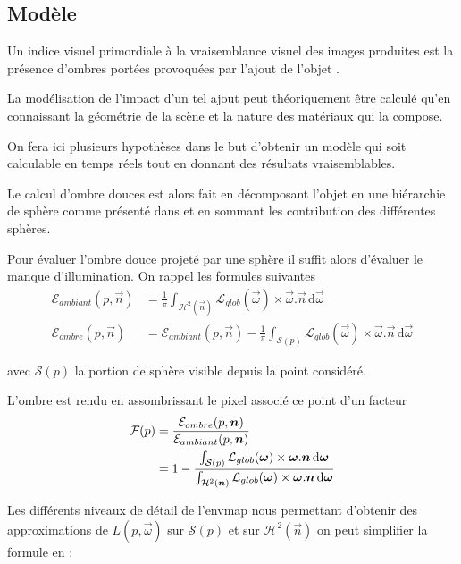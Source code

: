 \documentclass[10pt,a4paper,twoside, twocolumn]{report}
\begin{document}
\subsection{Modèle}

Un indice visuel primordiale à la vraisemblance visuel des images produites est la présence d'ombres portées provoquées par l'ajout de l'objet .

La modélisation de l'impact d'un tel ajout peut théoriquement être calculé qu'en connaissant la géométrie de la scène et la nature des matériaux qui la compose.

On fera ici plusieurs hypothèses dans le but d'obtenir un modèle qui soit calculable en temps réels tout en donnant des résultats vraisemblables.

Le calcul d'ombre douces est alors fait en décomposant l'objet en une hiérarchie de sphère comme présenté dans\cite{Iwanicki} et en sommant les contribution des différentes sphères.

Pour évaluer l'ombre douce projeté par une sphère il suffit alors d'évaluer le manque d'illumination.
On rappel les formules suivantes
\begin{align*}
	\mathcal E_{ambiant}(p, \vec n)	&=	\frac{1}{\pi}\int_{\mathcal{H}^2(\vec{n})}\mathcal L_{glob}(\vec\omega)\times\vec\omega.\vec n\, \mathrm d\vec\omega \\
	\mathcal E_{ombre}(p, \vec n)		&=	\mathcal E_{ambiant}(p, \vec n) - \frac{1}{\pi}\int_{\mathcal{S}(p)}\mathcal L_{glob}(\vec\omega)\times\vec\omega.\vec n\, \mathrm d\vec\omega
\end{align*}

avec $\mathcal S(p)$ la portion de sphère visible depuis la point considéré.

L'ombre est rendu en assombrissant le pixel associé ce point d'un facteur
\begin{align}
	\mathcal F(p)	&=	\frac{\mathcal E_{ombre}(p, \vec n)}{\mathcal E_{ambiant}(p, \vec n)}	\notag \\
								&=	1 - \frac{\int_{\mathcal{S}(p)}\mathcal L_{glob}(\vec\omega)\times\vec\omega.\vec n\, \mathrm d\vec\omega}{\int_{\mathcal{H}^2(\vec{n})}\mathcal L_{glob}(\vec\omega)\times\vec\omega.\vec n\, \mathrm d\vec\omega}	
\end{align}


Les différents niveaux de détail de l'envmap nous permettant d'obtenir des approximations de $L(p,\vec\omega)$ sur $\mathcal S(p)$ et sur $\mathcal{H}^2(\vec{n})$ on peut simplifier la formule en :
\end{document}
